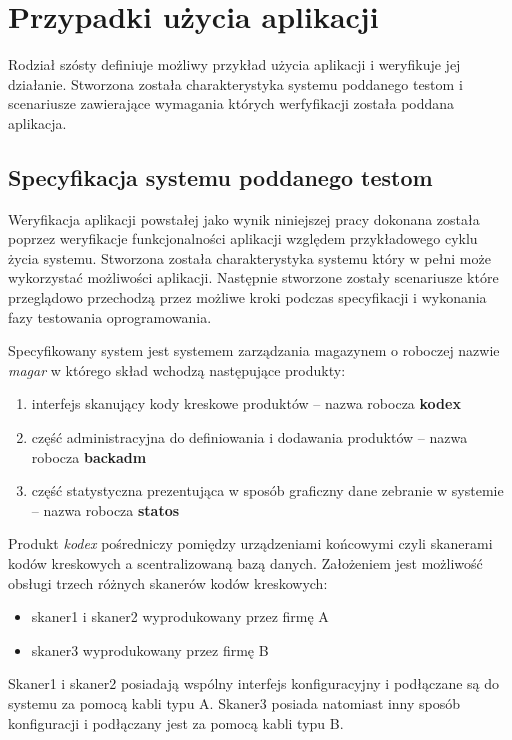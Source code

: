 \chapter{Przypadki użycia aplikacji}
Rodział szósty definiuje możliwy przykład użycia aplikacji i weryfikuje jej działanie. Stworzona została charakterystyka systemu poddanego testom i scenariusze zawierające wymagania których werfyfikacji została poddana aplikacja.

\section{Specyfikacja systemu poddanego testom}

Weryfikacja aplikacji powstałej jako wynik niniejszej pracy dokonana została poprzez weryfikacje funkcjonalności aplikacji względem przykładowego cyklu życia systemu. Stworzona została charakterystyka systemu który w pełni może wykorzystać możliwości aplikacji. Następnie stworzone zostały scenariusze które przeglądowo przechodzą przez możliwe kroki podczas specyfikacji i wykonania fazy testowania oprogramowania.

Specyfikowany system jest systemem zarządzania magazynem o roboczej nazwie \textit{magar} w którego skład wchodzą następujące produkty:
\begin{enumerate}
  \item interfejs skanujący kody kreskowe produktów -- nazwa robocza \textbf{kodex}
  \item część administracyjna do definiowania i dodawania produktów -- nazwa robocza \textbf{backadm}
  \item część statystyczna prezentująca w sposób graficzny dane zebranie w systemie -- nazwa robocza \textbf{statos}
\end{enumerate}

Produkt \textit{kodex} pośredniczy pomiędzy urządzeniami końcowymi czyli skanerami kodów kreskowych a scentralizowaną bazą danych. Założeniem jest możliwość obsługi trzech różnych skanerów kodów kreskowych:
\begin{itemize}
  \item skaner1 i skaner2 wyprodukowany przez firmę A
  \item skaner3 wyprodukowany przez firmę B
\end{itemize}
Skaner1 i skaner2 posiadają wspólny interfejs konfiguracyjny i podłączane są do systemu za pomocą kabli typu A. Skaner3 posiada natomiast inny sposób konfiguracji i podłączany jest za pomocą kabli typu B.

